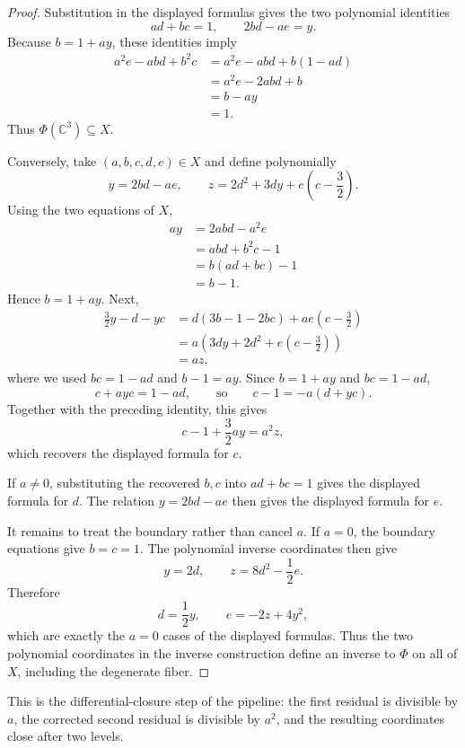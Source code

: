 \documentclass[11pt,letterpaper]{article}
\newcommand{\C}{\mathbb{C}}
\theoremstyle{jgpplain}
\begin{document}
\begin{proof}
Substitution in the displayed formulas gives the two polynomial identities
\[
ad+bc=1,
\qquad
2bd-ae=y.
\]
Because \(b=1+ay\), these identities imply
\begin{align*}
a^2e-abd+b^2c
  &=a^2e-abd+b(1-ad)\\
  &=a^2e-2abd+b\\
  &=b-ay\\
  &=1.
\end{align*}
Thus \(\Phi(\C^3)\subseteq X\).

Conversely, take \((a,b,c,d,e)\in X\) and define polynomially
\[
y=2bd-ae,
\qquad
z=2d^2+3dy+e\left(c-\frac32\right).
\]
Using the two equations of \(X\),
\begin{align*}
ay
  &=2abd-a^2e\\
  &=abd+b^2c-1\\
  &=b(ad+bc)-1\\
  &=b-1.
\end{align*}
Hence \(b=1+ay\). Next,
\begin{align*}
\frac32y-d-yc
  &=d(3b-1-2bc)+ae\left(c-\frac32\right)\\
  &=a\left(3dy+2d^2+e\left(c-\frac32\right)\right)\\
  &=az,
\end{align*}
where we used \(bc=1-ad\) and \(b-1=ay\). Since \(b=1+ay\) and
\(bc=1-ad\),
\[
c+ayc=1-ad,
\qquad\text{so}\qquad
c-1=-a(d+yc).
\]
Together with the preceding identity, this gives
\[
c-1+\frac32ay=a^2z,
\]
which recovers the displayed formula for \(c\).

If \(a\neq0\), substituting the recovered \(b,c\) into \(ad+bc=1\) gives the
displayed formula for \(d\). The relation \(y=2bd-ae\) then gives the displayed
formula for \(e\).

It remains to treat the boundary rather than cancel \(a\). If \(a=0\), the
boundary equations give \(b=c=1\). The polynomial inverse coordinates then
give
\[
y=2d,
\qquad
z=8d^2-\frac12e.
\]
Therefore
\[
d=\frac12y,
\qquad
e=-2z+4y^2,
\]
which are exactly the \(a=0\) cases of the displayed formulas. Thus the two
polynomial coordinates in the inverse construction define an inverse to
\(\Phi\) on all of \(X\), including the degenerate fiber.
\end{proof}

This is the differential-closure step of the pipeline: the first residual is
divisible by \(a\), the corrected second residual is divisible by \(a^2\), and
the resulting coordinates close after two levels.
\end{document}
